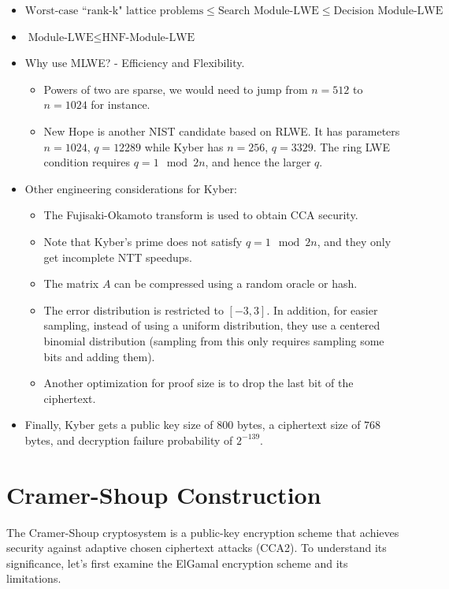 \begin{itemize}
    \item $\text{Worst-case ``rank-k" lattice problems} \leq \text{Search Module-LWE} \leq \text{Decision Module-LWE}$
    \item $\text{Module-LWE} \leq \text{HNF-Module-LWE}$ ~\cite{DCC:LanSte15}
    \item Why use MLWE? - Efficiency and Flexibility.
    \begin{itemize}
        \item Powers of two are sparse, we would need to jump from $n=512$ to $n=1024$ for instance.
        \item New Hope is another NIST candidate based on RLWE. It has parameters $n=1024$, $q=12289$ while Kyber has $n=256$, $q=3329$. The ring LWE condition requires $q = 1 \mod 2n$, and hence the larger $q$. 
    \end{itemize}
    \item Other engineering considerations for Kyber:
    \begin{itemize}
        \item The Fujisaki-Okamoto transform is used to obtain CCA security.
        \item Note that Kyber's prime does not satisfy $q = 1 \mod 2n$, and they only get incomplete NTT speedups.
        \item The matrix $A$ can be compressed using a random oracle or hash.
        \item The error distribution is restricted to $[-3,3]$. In addition, for easier sampling, instead of using a uniform distribution, they use a centered binomial distribution (sampling from this only requires sampling some bits and adding them).
        \item Another optimization for proof size is to drop the last bit of the ciphertext.
    \end{itemize}
    \item Finally, Kyber gets a public key size of $800$ bytes, a ciphertext size of $768$ bytes, and decryption failure probability of $2^{-139}$.
\end{itemize} 
\section{Cramer-Shoup Construction}

The Cramer-Shoup cryptosystem is a public-key encryption scheme that achieves security against adaptive chosen ciphertext attacks (CCA2). To understand its significance, let's first examine the ElGamal encryption scheme and its limitations.

